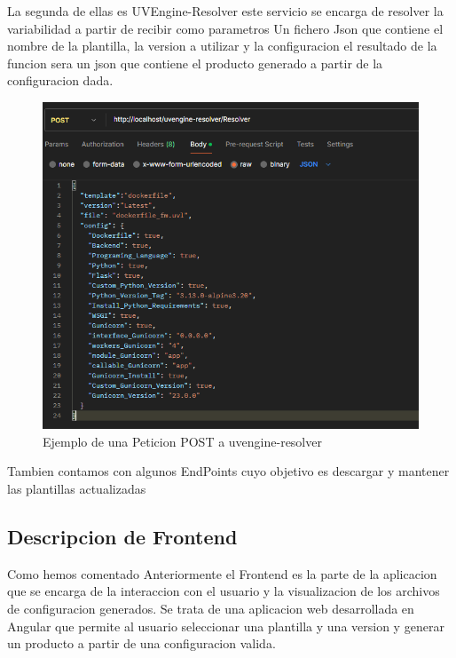 \documentclass[12pt, a4paper, twoside]{article}
\begin{document}
La segunda de ellas es UVEngine-Resolver este servicio se encarga de resolver la variabilidad a partir de recibir como parametros Un fichero Json que contiene el nombre de la plantilla, la version a utilizar y la configuracion 
el resultado de la funcion sera un json que contiene el producto generado a partir de la configuracion dada. 
\begin{figure}[h]
	\centering
	  \includegraphics[width=1\textwidth]{Peticion POST uvengine-resolver.png}
	\caption{Ejemplo de una Peticion POST a uvengine-resolver}
\end{figure}
Tambien contamos con algunos EndPoints cuyo objetivo es descargar y mantener las plantillas actualizadas
\newpage
\subsection{Descripcion de Frontend}
Como hemos comentado Anteriormente el Frontend es la parte de la aplicacion que se encarga de la interaccion con el usuario y la visualizacion de los archivos de configuracion generados.
Se trata de una aplicacion web desarrollada en Angular que permite al usuario seleccionar una plantilla y una version y generar un producto a partir de una configuracion valida.
\end{document}

